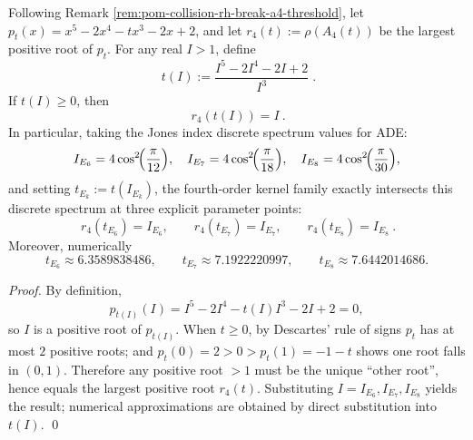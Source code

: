 \begin{proposition}\label{prop:pom-a4t-jones-ade-intersections}
Following Remark \ref{rem:pom-collision-rh-break-a4-threshold}, let
\(
p_t(x)=x^5-2x^4-tx^3-2x+2
\), and let
\(
r_4(t):=\rho(A_4(t))
\)
be the largest positive root of \(p_t\).
For any real \(I>1\), define
\[
\boxed{\;
t(I):=\frac{I^5-2I^4-2I+2}{I^3}\; }.
\]
If \(t(I)\ge 0\), then
\[
\boxed{\ r_4(t(I))=I\ }.
\]
In particular, taking the Jones index discrete spectrum values for ADE:
\[
I_{E_6}=4\cos^2\!\Bigl(\frac{\pi}{12}\Bigr),\quad
I_{E_7}=4\cos^2\!\Bigl(\frac{\pi}{18}\Bigr),\quad
I_{E_8}=4\cos^2\!\Bigl(\frac{\pi}{30}\Bigr),
\]
and setting \(t_{E_k}:=t(I_{E_k})\), the fourth-order kernel family exactly intersects this discrete spectrum at three explicit parameter points:
\[
\boxed{\ r_4(t_{E_6})=I_{E_6},\qquad r_4(t_{E_7})=I_{E_7},\qquad r_4(t_{E_8})=I_{E_8}\ }.
\]
Moreover, numerically
\[
t_{E_6}\approx 6.3589838486,\qquad
t_{E_7}\approx 7.1922220997,\qquad
t_{E_8}\approx 7.6442014686.
\]
\end{proposition}
\begin{proof}
By definition,
\[
p_{t(I)}(I)=I^5-2I^4-t(I)I^3-2I+2=0,
\]
so \(I\) is a positive root of \(p_{t(I)}\).
When \(t\ge 0\), by Descartes' rule of signs \(p_t\) has at most \(2\) positive roots;
and \(p_t(0)=2>0>p_t(1)=-1-t\) shows one root falls in \((0,1)\).
Therefore any positive root \(>1\) must be the unique ``other root'', hence equals the largest positive root \(r_4(t)\).
Substituting \(I=I_{E_6},I_{E_7},I_{E_8}\) yields the result; numerical approximations are obtained by direct substitution into \(t(I)\). \qed
\end{proof}

